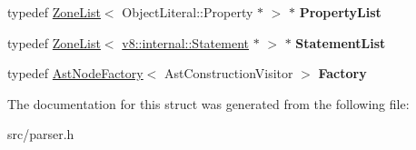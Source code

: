 \begin{DoxyCompactItemize}
\item 
\hypertarget{structv8_1_1internal_1_1_parser_traits_1_1_type_ac7d855e7a3b0accd8de2e498b71f80fd}{}typedef \hyperlink{classv8_1_1internal_1_1_zone_list}{Zone\+List}$<$ Object\+Literal\+::\+Property $\ast$ $>$ $\ast$ {\bfseries Property\+List}\label{structv8_1_1internal_1_1_parser_traits_1_1_type_ac7d855e7a3b0accd8de2e498b71f80fd}

\item 
\hypertarget{structv8_1_1internal_1_1_parser_traits_1_1_type_ae6ac4ee941ccf6d63eb66a8aee544f25}{}typedef \hyperlink{classv8_1_1internal_1_1_zone_list}{Zone\+List}$<$ \hyperlink{classv8_1_1internal_1_1_statement}{v8\+::internal\+::\+Statement} $\ast$ $>$ $\ast$ {\bfseries Statement\+List}\label{structv8_1_1internal_1_1_parser_traits_1_1_type_ae6ac4ee941ccf6d63eb66a8aee544f25}

\item 
\hypertarget{structv8_1_1internal_1_1_parser_traits_1_1_type_ad13f84b84e049d30fa4206fa67bcfc19}{}typedef \hyperlink{classv8_1_1internal_1_1_ast_node_factory}{Ast\+Node\+Factory}$<$ Ast\+Construction\+Visitor $>$ {\bfseries Factory}\label{structv8_1_1internal_1_1_parser_traits_1_1_type_ad13f84b84e049d30fa4206fa67bcfc19}

\end{DoxyCompactItemize}


The documentation for this struct was generated from the following file\+:\begin{DoxyCompactItemize}
\item 
src/parser.\+h\end{DoxyCompactItemize}
